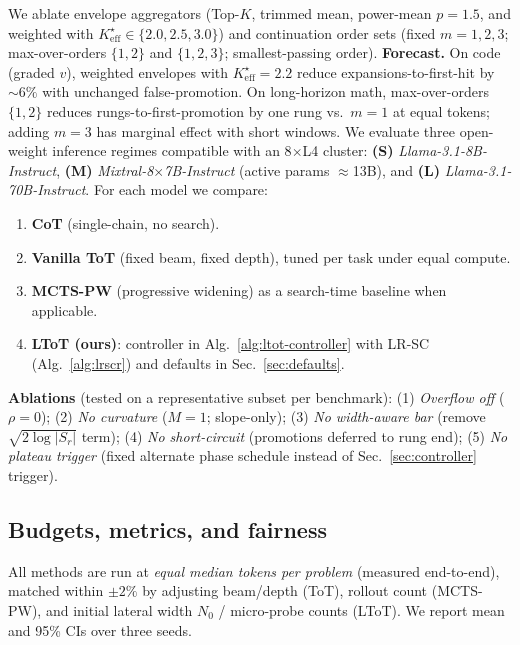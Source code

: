 \documentclass{article}
\begin{document}
We ablate envelope aggregators (Top-$K$, trimmed mean, power-mean $p{=}1.5$, and weighted with $K_{\mathrm{eff}}^\star\!\in\!\{2.0,2.5,3.0\}$)
and continuation order sets (fixed $m{=}1,2,3$; max-over-orders $\{1,2\}$ and $\{1,2,3\}$; smallest-passing order).
\textbf{Forecast.} On code (graded $v$), weighted envelopes with $K_{\mathrm{eff}}^\star{=}2.2$ reduce expansions-to-first-hit by $\sim\!6\%$ with unchanged false-promotion.
On long-horizon math, max-over-orders $\{1,2\}$ reduces rungs-to-first-promotion by one rung vs.\ $m{=}1$ at equal tokens; adding $m{=}3$ has marginal effect with short windows.
We evaluate three open-weight inference regimes compatible with an 8$\times$L4 cluster:
\textbf{(S)} \emph{Llama-3.1-8B-Instruct},
\textbf{(M)} \emph{Mixtral-8$\times$7B-Instruct} (active params $\approx$13B), and
\textbf{(L)} \emph{Llama-3.1-70B-Instruct}.
For each model we compare:

\begin{enumerate}[leftmargin=*, itemsep=2pt, topsep=2pt]
    \item \textbf{CoT} (single-chain, no search).
    \item \textbf{Vanilla ToT} (fixed beam, fixed depth), tuned per task under equal compute.
    \item \textbf{MCTS-PW} (progressive widening) as a search-time baseline when applicable.
    \item \textbf{LToT (ours)}: controller in Alg.~\ref{alg:ltot-controller} with LR-SC (Alg.~\ref{alg:lrscr}) and defaults in Sec.~\ref{sec:defaults}.
\end{enumerate}

\noindent\textbf{Ablations} (tested on a representative subset per benchmark):
(1) \emph{Overflow off} ($\rho{=}0$);
(2) \emph{No curvature} ($M{=}1$; slope-only);
(3) \emph{No width-aware bar} (remove $\sqrt{2\log |S_r|}$ term);
(4) \emph{No short-circuit} (promotions deferred to rung end);
(5) \emph{No plateau trigger} (fixed alternate phase schedule instead of Sec.~\ref{sec:controller} trigger).

\subsection{Budgets, metrics, and fairness}
\label{subsec:budgets-metrics}
All methods are run at \emph{equal median tokens per problem} (measured end-to-end), matched within $\pm 2\%$ by adjusting beam/depth (ToT), rollout count (MCTS-PW), and initial lateral width $N_0$ / micro-probe counts (LToT).
We report mean and 95\% CIs over three seeds.
\end{document}
